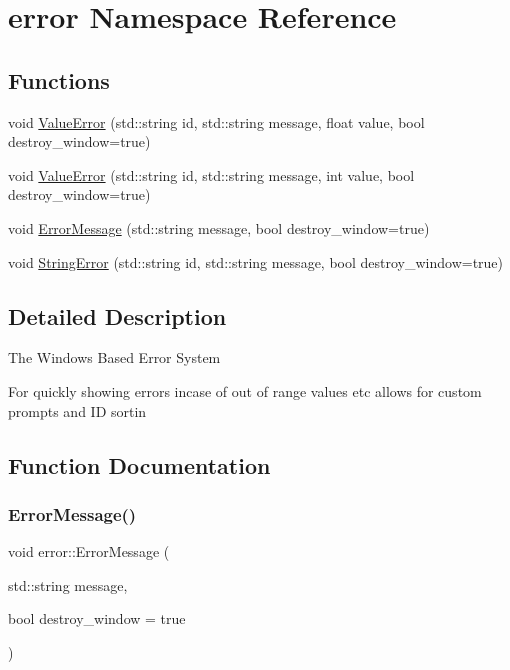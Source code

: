 \hypertarget{namespaceerror}{}\section{error Namespace Reference}
\label{namespaceerror}
\subsection*{Functions}
\begin{DoxyCompactItemize}
\item 
void \hyperlink{namespaceerror_a019f42947a3ea3414560875df66d5eb5}{Value\+Error} (std\+::string id, std\+::string message, float value, bool destroy\+\_\+window=true)
\item 
void \hyperlink{namespaceerror_a7d5d0c6be08af9155409c2f1c900dbb1}{Value\+Error} (std\+::string id, std\+::string message, int value, bool destroy\+\_\+window=true)
\item 
void \hyperlink{namespaceerror_a6d9707ac0b5ce39b0bcd7b37862a47b4}{Error\+Message} (std\+::string message, bool destroy\+\_\+window=true)
\item 
void \hyperlink{namespaceerror_a66d4ae4163a05f4ee9b28831c6c8118a}{String\+Error} (std\+::string id, std\+::string message, bool destroy\+\_\+window=true)
\end{DoxyCompactItemize}


\subsection{Detailed Description}
The Windows Based Error System

For quickly showing errors incase of out of range values etc allows for custom prompts and ID sortin 

\subsection{Function Documentation}
\hypertarget{namespaceerror_a6d9707ac0b5ce39b0bcd7b37862a47b4}{}\label{namespaceerror_a6d9707ac0b5ce39b0bcd7b37862a47b4} 
\subsubsection{\texorpdfstring{Error\+Message()}{ErrorMessage()}}
{\footnotesize\ttfamily void error\+::\+Error\+Message (\begin{DoxyParamCaption}\item[{std\+::string}]{message,  }\item[{bool}]{destroy\+\_\+window = {\ttfamily true} }\end{DoxyParamCaption})}

